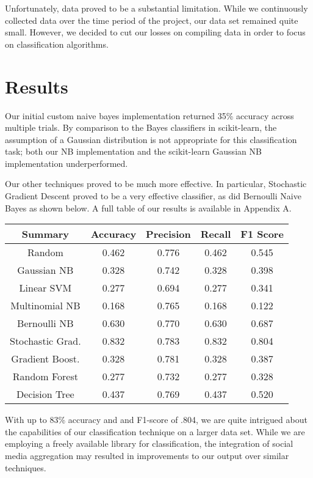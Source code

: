 \documentclass[letterpaper]{article}
\begin{document}
Unfortunately, data proved to be a substantial limitation.  While we continuously collected data over the time period of the project, our data set remained quite small.  However, we decided to cut our losses on compiling data in order to focus on classification algorithms.

\section{Results}

\noindent Our initial custom naive bayes implementation returned 35\% accuracy across multiple trials. By comparison to the Bayes classifiers in scikit-learn, the assumption of a Gaussian distribution is not appropriate for this classification task; both our NB implementation and the scikit-learn Gaussian NB implementation underperformed.

Our other techniques proved to be much more effective. In particular, Stochastic Gradient Descent proved to be a very effective classifier, as did Bernoulli Naive Bayes as shown below.  A full table of our results is available in Appendix A.

{\small
\begin{tabular}{c | c c c c}
\textbf{Summary}    & Accuracy  & Precision & Recall    & F1 Score  \\
\hline
Random      & 0.462     & 0.776     & 0.462     & 0.545     \\
Gaussian NB     & 0.328     & 0.742     & 0.328     & 0.398     \\
Linear SVM      & 0.277     & 0.694     & 0.277     & 0.341     \\
Multinomial NB     & 0.168     & 0.765     & 0.168     & 0.122     \\
Bernoulli NB       & 0.630     & 0.770     & 0.630     & 0.687     \\
Stochastic Grad.     & 0.832     & 0.783     & 0.832     & 0.804     \\
Gradient Boost.        & 0.328     & 0.781     & 0.328     & 0.387     \\
Random Forest        & 0.277     & 0.732     & 0.277     & 0.328     \\
Decision Tree        & 0.437     & 0.769     & 0.437     & 0.520     \\
\end{tabular}
}

With up to 83\% accuracy and and F1-score of .804, we are quite intrigued about the capabilities of our classification technique on a larger data set. While we are employing a freely available library for classification, the integration of social media aggregation may resulted in improvements to our output over similar techniques.
\end{document}
